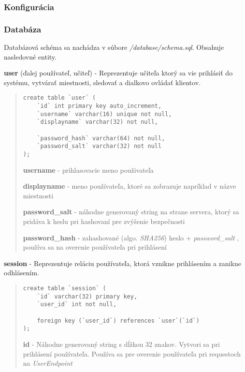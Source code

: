 \documentclass{article}
\newcommand{\filedesc}[1]{\vspace{0.3cm} \noindent \textbf{#1}}
\newcommand{\file}[1]{\emph{#1}}
\begin{document}
\subsubsection{Konfigurácia}

\subsubsection{Databáza}

Databázová schéma sa nachádza v súbore \file{/database/schema.sql}. Obsahuje nasledovné entity.

\filedesc{user} (ďalej používateľ, učiteľ) - Reprezentuje učiteľa ktorý sa vie prihlásiť do systému, vytvárať miestnosti, sledovať a dialkovo ovládať klientov.
\begin{quote}

\begin{verbatim}
create table `user` (
    `id` int primary key auto_increment,
    `username` varchar(16) unique not null,
    `displayname` varchar(32) not null,

    `password_hash` varchar(64) not null,
    `password_salt` varchar(32) not null
);
\end{verbatim}

\filedesc{username} - prihlasovacie meno použivateľa

\filedesc{displayname} - meno používateľa, ktoré sa zobrazuje napríklad v názve miestnosti

\filedesc{password{\_}salt} - náhodne generovaný string na strane servera, ktorý sa pridáva k heslu pri hashovaní pre zvýšenie bezpečnosti

\filedesc{password{\_}hash} - zahashované (algo. \emph{SHA256}) heslo + \emph{password{\_}salt} , používa sa na overenie používateľa pri prihlásení

\end{quote}

\filedesc{session} - Reprezentuje reláciu používateľa, ktorá vznikne prihlásením a zanikne odhlásením.

\begin{quote}

\begin{verbatim}
create table `session` (
    `id` varchar(32) primary key,
    `user_id` int not null,

    foreign key (`user_id`) references `user`(`id`)
);
\end{verbatim}

\filedesc{id} - Náhodne generovaný string s dĺžkou 32 znakov. Vytvori sa pri prihlásení používateľa. Používa sa pre overenie používateľa pri requestoch na \emph{UserEndpoint}

\end{quote}
\end{document}
